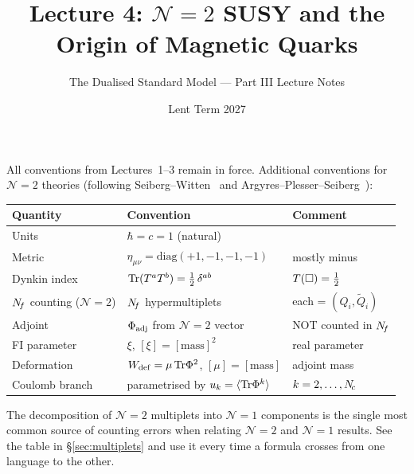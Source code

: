 \documentclass[11pt,a4paper]{article}
\title{\textbf{Lecture 4: $\mathcal{N}=2$ SUSY and the Origin of Magnetic Quarks}}
\author{The Dualised Standard Model --- Part III Lecture Notes}
\date{Lent Term 2027}
\begin{document}
\maketitle

\tableofcontents
\newpage


\begin{conventionbox}[title={Conventions for Lecture 4}]
All conventions from Lectures~1--3 remain in force.  Additional conventions
for $\mathcal{N}=2$ theories (following Seiberg--Witten~\cite{SW1994}
and Argyres--Plesser--Seiberg~\cite{APS1996}):

\renewcommand{\arraystretch}{1.3}
\begin{tabular}{@{}l l l@{}}
\toprule
\textbf{Quantity} & \textbf{Convention} & \textbf{Comment} \\
\midrule
Units & $\hbar = c = 1$ (natural) & \\
Metric & $\eta_{\mu\nu} = \mathrm{diag}(+1,-1,-1,-1)$ & mostly minus \\
Dynkin index & $\mathrm{Tr}(T^a T^b) = \tfrac{1}{2}\, \delta^{ab}$ & $T(\square) = \tfrac{1}{2}$ \\
$N_{\!f}$ counting (${}\mathcal{N}=2$) & $N_{\!f}$ hypermultiplets & each = $(Q_i, \widetilde{Q}_i)$ \\
Adjoint & $\Phi_{\mathrm{adj}}$ from $\mathcal{N}=2$ vector & NOT counted in $N_{\!f}$ \\
FI parameter & $\xi$, \;$[\xi] = [\mathrm{mass}]^2$ & real parameter \\
Deformation & $W_{\mathrm{def}} = \mu\,\mathrm{Tr}\Phi^2$, \;$[\mu] = [\mathrm{mass}]$ & adjoint mass \\
Coulomb branch & parametrised by $u_k = \langle\mathrm{Tr}\Phi^k\rangle$ & $k = 2,\ldots,N_{\!c}$ \\
\bottomrule
\end{tabular}
\end{conventionbox}

\begin{warningbox}[title={$\mathcal{N}=1$ / $\mathcal{N}=2$ counting}]
The decomposition of $\mathcal{N}=2$ multiplets into $\mathcal{N}=1$
components is the single most common source of counting errors
when relating $\mathcal{N}=2$ and $\mathcal{N}=1$ results.  See the
table in \S\ref{sec:multiplets} and use it every time a formula crosses
from one language to the other.
\end{warningbox}
\end{document}
